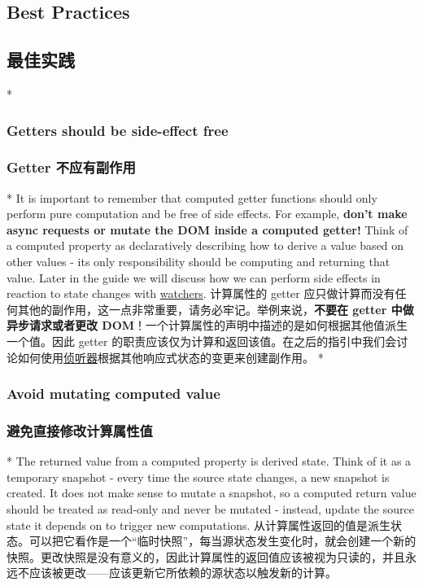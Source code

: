\begin{paracol}{2}
\subsection{Best Practices}
\switchcolumn
\subsection{最佳实践}
\switchcolumn[0]*%
\subsubsection{Getters should be side-effect free}
\switchcolumn
\subsubsection{Getter 不应有副作用}
\switchcolumn[0]*%
It is important to remember that computed getter functions should only
perform pure computation and be free of side effects. For example,
\textbf{don't make async requests or mutate the DOM inside a computed
getter!} Think of a computed property as declaratively describing how to
derive a value based on other values - its only responsibility should be
computing and returning that value. Later in the guide we will discuss
how we can perform side effects in reaction to state changes with
\href{https://vuejs.org/guide/essentials/watchers.html}{watchers}.
\switchcolumn
计算属性的 getter
应只做计算而没有任何其他的副作用，这一点非常重要，请务必牢记。举例来说，\textbf{不要在
getter 中做异步请求或者更改
DOM}！一个计算属性的声明中描述的是如何根据其他值派生一个值。因此 getter
的职责应该仅为计算和返回该值。在之后的指引中我们会讨论如何使用\href{https://cn.vuejs.org/guide/essentials/watchers.html}{侦听器}根据其他响应式状态的变更来创建副作用。
\switchcolumn[0]*%
\subsubsection{Avoid mutating computed value}
\switchcolumn
\subsubsection{避免直接修改计算属性值}
\switchcolumn[0]*%
The returned value from a computed property is derived state. Think of
it as a temporary snapshot - every time the source state changes, a new
snapshot is created. It does not make sense to mutate a snapshot, so a
computed return value should be treated as read-only and never be
mutated - instead, update the source state it depends on to trigger new
computations.
\switchcolumn
从计算属性返回的值是派生状态。可以把它看作是一个``临时快照''，每当源状态发生变化时，就会创建一个新的快照。更改快照是没有意义的，因此计算属性的返回值应该被视为只读的，并且永远不应该被更改------应该更新它所依赖的源状态以触发新的计算。
\end{paracol}
 




